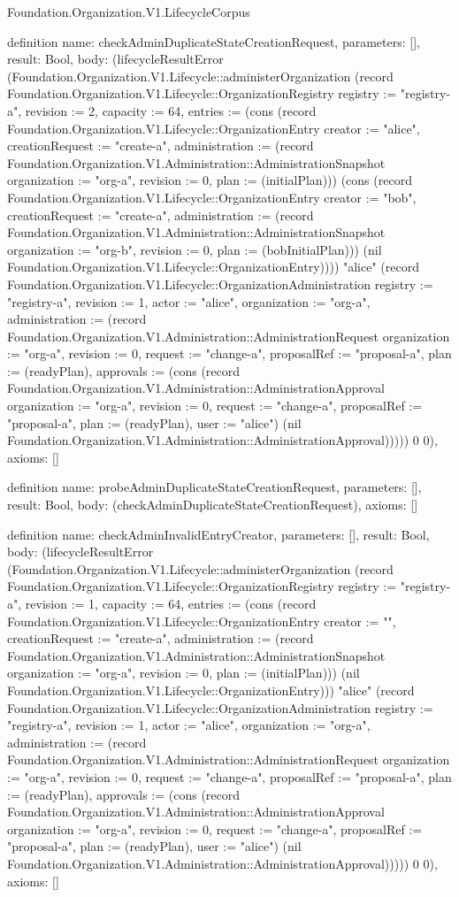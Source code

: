 \begin{lexlean}{Foundation.Organization.V1.LifecycleCorpus}
\begin{semanticmodule}
definition{
  name: checkAdminDuplicateStateCreationRequest,
  parameters: [],
  result: Bool,
  body: (lifecycleResultError (Foundation.Organization.V1.Lifecycle::administerOrganization (record Foundation.Organization.V1.Lifecycle::OrganizationRegistry {registry := "registry-a", revision := 2, capacity := 64, entries := (cons (record Foundation.Organization.V1.Lifecycle::OrganizationEntry {creator := "alice", creationRequest := "create-a", administration := (record Foundation.Organization.V1.Administration::AdministrationSnapshot {organization := "org-a", revision := 0, plan := (initialPlan)})}) (cons (record Foundation.Organization.V1.Lifecycle::OrganizationEntry {creator := "bob", creationRequest := "create-a", administration := (record Foundation.Organization.V1.Administration::AdministrationSnapshot {organization := "org-b", revision := 0, plan := (bobInitialPlan)})}) (nil Foundation.Organization.V1.Lifecycle::OrganizationEntry)))}) "alice" (record Foundation.Organization.V1.Lifecycle::OrganizationAdministration {registry := "registry-a", revision := 1, actor := "alice", organization := "org-a", administration := (record Foundation.Organization.V1.Administration::AdministrationRequest {organization := "org-a", revision := 0, request := "change-a", proposalRef := "proposal-a", plan := (readyPlan), approvals := (cons (record Foundation.Organization.V1.Administration::AdministrationApproval {organization := "org-a", revision := 0, request := "change-a", proposalRef := "proposal-a", plan := (readyPlan), user := "alice"}) (nil Foundation.Organization.V1.Administration::AdministrationApproval))})})) 0 0),
  axioms: []
}

definition{
  name: probeAdminDuplicateStateCreationRequest,
  parameters: [],
  result: Bool,
  body: (checkAdminDuplicateStateCreationRequest),
  axioms: []
}

definition{
  name: checkAdminInvalidEntryCreator,
  parameters: [],
  result: Bool,
  body: (lifecycleResultError (Foundation.Organization.V1.Lifecycle::administerOrganization (record Foundation.Organization.V1.Lifecycle::OrganizationRegistry {registry := "registry-a", revision := 1, capacity := 64, entries := (cons (record Foundation.Organization.V1.Lifecycle::OrganizationEntry {creator := "", creationRequest := "create-a", administration := (record Foundation.Organization.V1.Administration::AdministrationSnapshot {organization := "org-a", revision := 0, plan := (initialPlan)})}) (nil Foundation.Organization.V1.Lifecycle::OrganizationEntry))}) "alice" (record Foundation.Organization.V1.Lifecycle::OrganizationAdministration {registry := "registry-a", revision := 1, actor := "alice", organization := "org-a", administration := (record Foundation.Organization.V1.Administration::AdministrationRequest {organization := "org-a", revision := 0, request := "change-a", proposalRef := "proposal-a", plan := (readyPlan), approvals := (cons (record Foundation.Organization.V1.Administration::AdministrationApproval {organization := "org-a", revision := 0, request := "change-a", proposalRef := "proposal-a", plan := (readyPlan), user := "alice"}) (nil Foundation.Organization.V1.Administration::AdministrationApproval))})})) 0 0),
  axioms: []
}


\end{semanticmodule}
\end{lexlean}
